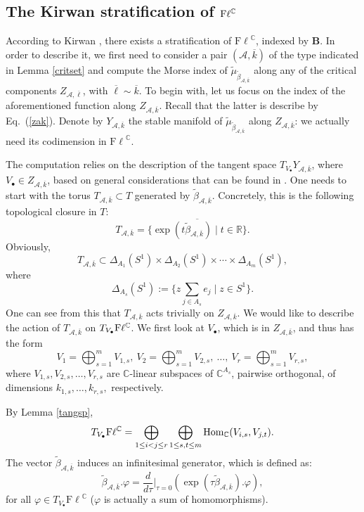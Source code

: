 \documentclass[12pt]{amsart}
\theoremstyle{definition}
\theoremstyle{remark}
\newcommand{\RR}{\mathbb R}
\newcommand{\CC}{\mathbb C}
\newcommand{\vk}{\overline{k}}
\newcommand{\A}{{\mathcal A}}
\newcommand{\Fl}{{\mathrm{F\ell}}}
\newcommand{\be}{\A, \vk}
\newcommand{\bet}{\tilde{\beta}}
\begin{document}
\subsection{The Kirwan stratification of ${\rm F}\ell^\CC$} \label{complex}

 According to Kirwan \cite[Thm.~4.16]{Ki}, there exists a stratification of $\Fl^\CC$, indexed by ${\mathbf B}$. In order to describe it, we first need to consider 
 a pair $(\A, \vk)$ of the type indicated in Lemma \ref{critset} and compute the Morse index of $\tilde{\mu}_{\tilde{\beta}_{\A, \vk}}$ along any of the critical components 
 $Z_{\A, \overline{\ell}}$, with $\overline{\ell}\sim\overline{k}$. To begin with, let us focus on the index of the aforementioned function along $Z_{\A, \overline{k}}$. Recall that the latter is describe by Eq.~(\ref{zak}).
 Denote by $Y_{\be}$ the stable manifold of $\tilde{\mu}_{\tilde{\beta}_{\A, \vk }}$ along $Z_{\be}$: we actually need its codimension in $\Fl^\CC$. 
 
 The computation relies on the description of the tangent space $T_{V_\bullet} Y_{\be}$, where $V_\bullet \in Z_{\be}$, based on general considerations that can be found  in \cite{Ki}. 
One needs to start with the torus $T_{\be}\subset T$ generated by $\bet_{\be}$. Concretely, this  is the following topological closure 
in $T$:
$$T_{\be}=\overline{\{\exp ( t\bet_{\be}) \mid t \in \RR\}}.$$
Obviously,
$$T_{\be} \subset \Delta_{A_1}(S^1) \times \Delta_{A_2}(S^1) \times \cdots \times \Delta_{A_m}(S^1),$$
where 
$$\Delta_{A_s}(S^1):=\{z \sum_{j\in A_s} e_j \mid z \in S^1\}.$$
One can see from this that $T_{\be}$ acts trivially on $Z_{\be}$. 
  We would like to describe the action of $T_{\be}$ on $T_{V_\bullet} {\rm F}\ell^\CC$.  
  We first look at $V_\bullet$, which is in $Z_{\be}$,  and thus has the form
  $$V_1=\bigoplus_{s=1}^m V_{1,s},  \ V_2=\bigoplus_{s=1}^m V_{2,s},  \ \ldots ,  \ V_r=\bigoplus_{s=1}^m V_{r,s},$$
  where
    $V_{1,s}, V_{2,s}, \ldots, V_{r,s}$ are $\CC$-linear subspaces of $\CC^{A_s}$, pairwise orthogonal, of dimensions $k_{1,s}, \ldots, k_{r,s},$ respectively.
    
   By Lemma \ref{tangsp}, 
   $$T_{V_\bullet}{\rm F}\ell^\CC = \bigoplus_{1\le i < j \le r} \bigoplus_{1\le s , t \le m}  {\rm Hom}_\CC (V_{i,s}, V_{j, t}).$$
The vector $\bet_{\be}$ induces an infinitesimal generator, which is defined as:
$$\bet_{\be} . \varphi = \frac{d}{d\tau}\Big|_{\tau=0}\left(\exp (\tau \bet_{\be}) .\varphi\right),$$
for all $\varphi \in T_{V_\bullet}\Fl^\CC$ ($\varphi$ is actually a sum of homomorphisms). 
\end{document}
